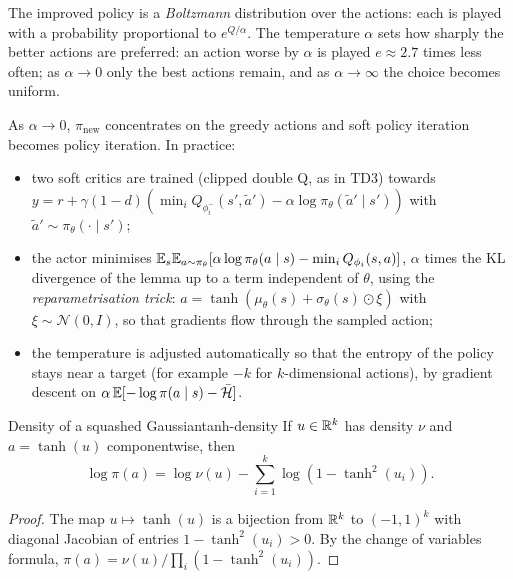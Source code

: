\begin{intuition}
  The improved policy is a \emph{Boltzmann} distribution over the actions:
  each is played with a probability proportional to $e^{Q/\alpha}$. The
  temperature $\alpha$ sets how sharply the better actions are preferred:
  an action worse by $\alpha$ is played $e \approx 2.7$ times less often;
  as $\alpha \to 0$ only the best actions remain, and as $\alpha \to
  \infty$ the choice becomes uniform.
\end{intuition}

As $\alpha \to 0$, $\pi_{\mathrm{new}}$ concentrates on the greedy actions
and soft policy iteration becomes policy iteration. In practice:
\begin{itemize}
  \item two soft critics are trained (clipped double Q, as in TD3) towards
    $y = r + \gamma (1 - d) \left( \min_i Q_{\phi_i^-}(s', \tilde a') -
    \alpha \log \pi_\theta(\tilde a' \mid s') \right)$ with $\tilde a' \sim
    \pi_\theta(\cdot \mid s')$;
  \item the actor minimises $\mathbb{E}_{s} \mathbb{E}_{a \sim \pi_\theta}[\alpha \log
    \pi_\theta(a \mid s) - \min_i Q_{\phi_i}(s, a)]$, $\alpha$ times the KL
    divergence of the lemma up to a term independent of $\theta$, using the
    \emph{reparametrisation trick}: $a = \tanh(\mu_\theta(s) + \sigma_\theta(s)
    \odot \xi)$ with $\xi \sim
    \mathcal{N}(0, I)$, so that gradients flow through the sampled action;
  \item the temperature is adjusted automatically so that the entropy of
    the policy stays near a target (for example $-k$ for $k$-dimensional
    actions), by gradient descent on $\alpha\, \mathbb{E}[-\log \pi(a \mid s) -
    \bar{\mathcal{H}}]$.
\end{itemize}

\begin{proposition}{Density of a squashed Gaussian}{tanh-density}
  If $u \in \mathbb{R}^k$ has density $\nu$ and $a = \tanh(u)$ componentwise, then
  \begin{equation}
    \log \pi(a) = \log \nu(u) - \sum_{i=1}^{k} \log\left(1 - \tanh^2
    (u_i)\right).
  \end{equation}
\end{proposition}

\begin{proof}
  The map $u \mapsto \tanh(u)$ is a bijection from $\mathbb{R}^k$ to $(-1, 1)^k$
  with diagonal Jacobian of entries $1 - \tanh^2(u_i) > 0$. By the change of
  variables formula, $\pi(a) = \nu(u) / \prod_i (1 - \tanh^2(u_i))$.
\end{proof}

